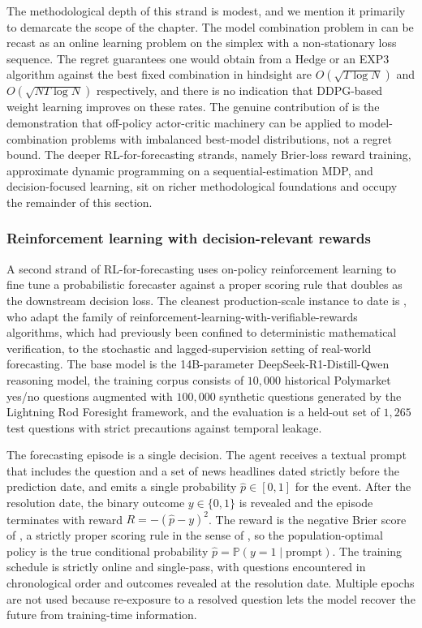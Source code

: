 The methodological depth of this strand is modest, and we mention it primarily to
demarcate the scope of the chapter. The model combination problem in
\citet{Fu2022} can be recast as an online learning problem on the simplex with a
non-stationary loss sequence. The regret guarantees one would obtain from a Hedge
or an EXP3 algorithm against the best fixed combination in hindsight are
$O(\sqrt{T \log N})$ and $O(\sqrt{N T \log N})$ respectively, and there is no
indication that DDPG-based weight learning improves on these rates. The genuine
contribution of \citet{Fu2022} is the demonstration that off-policy actor-critic
machinery can be applied to model-combination problems with imbalanced
best-model distributions, not a regret bound. The deeper RL-for-forecasting
strands, namely Brier-loss reward training, approximate dynamic programming on a
sequential-estimation MDP, and decision-focused learning, sit on richer
methodological foundations and occupy the remainder of this section.

\subsubsection{Reinforcement learning with decision-relevant rewards}
\label{sec:rl_brier}

A second strand of RL-for-forecasting uses on-policy reinforcement learning to fine
tune a probabilistic forecaster against a proper scoring rule that doubles as the
downstream decision loss. The cleanest production-scale instance to date is
\citet{Turtel2025}, who adapt the family of reinforcement-learning-with-verifiable-rewards
algorithms, which had previously been confined to deterministic mathematical
verification, to the stochastic and lagged-supervision setting of real-world
forecasting. The base model is the 14B-parameter DeepSeek-R1-Distill-Qwen reasoning
model, the training corpus consists of $10{,}000$ historical Polymarket yes/no
questions augmented with $100{,}000$ synthetic questions generated by the Lightning
Rod Foresight framework, and the evaluation is a held-out set of $1{,}265$ test
questions with strict precautions against temporal leakage.

The forecasting episode is a single decision. The agent receives a textual prompt
that includes the question and a set of news headlines dated strictly before the
prediction date, and emits a single probability $\hat p \in [0, 1]$ for the event.
After the resolution date, the binary outcome $y \in \{0, 1\}$ is revealed and the
episode terminates with reward $R = -(\hat p - y)^2$. The reward is the negative
Brier score of \citet{Brier1950}, a strictly proper scoring rule in the sense of
\citet{GneitingRaftery2007}, so the population-optimal policy is the true
conditional probability $\hat p = \mathbb P(y = 1 \mid \text{prompt})$. The training
schedule is strictly online and single-pass, with questions encountered in
chronological order and outcomes revealed at the resolution date. Multiple epochs
are not used because re-exposure to a resolved question lets the model recover the
future from training-time information.


